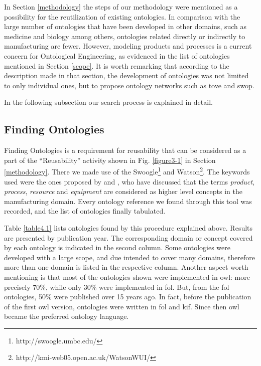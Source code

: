 In Section \ref{methodology} the steps of our methodology were mentioned as a possibility for the reutilization of existing ontologies. In comparison with the large number of ontologies that have been developed in other domains, such as medicine and biology among others, ontologies related directly or indirectly to manufacturing are fewer.  However, modeling products and processes is a current concern for Ontological Engineering, as evidenced in the list of ontologies mentioned in Section \ref{scope}. It is worth remarking that according to the description made in that section, the development of ontologies was not limited to only individual ones, but to propose ontology networks such as \gls{tove} and \gls{swop}. 

In the following subsection our search process is explained in detail. 


\subsection{Finding Ontologies}\label{4.2.1}

Finding Ontologies is a requirement for reusability that can be considered as a part of the “Reusability” activity shown in Fig. \ref{figure3-1} in Section \ref{methodology}. There we made use of the Swoogle\footnote{http://swoogle.umbc.edu/}  and Watson\footnote{http://kmi-web05.open.ac.uk/WatsonWUI/}. The keywords used were the ones proposed by \cite{martin_design_2003} and \cite{lastra_ontologies_2009}, who have discussed that the terms \textit{product}, \textit{process},  \textit{resource} and \textit{equipment} are considered as higher level concepts in the manufacturing domain. Every ontology reference we found through this tool was recorded, and the list of ontologies finally tabulated.

Table \ref{table4.1} lists ontologies found by this procedure explained above. Results are presented by publication year. The corresponding domain or concept covered by each ontology is indicated in the second column. Some ontologies were developed with a large scope, and due intended to cover many domains, therefore more than one domain is listed in the respective column. Another aspect worth mentioning is that most of the ontologies shown were implemented in \gls{owl}: more precisely 70\%, while only 30\% were implemented in \gls{fol}. But, from the \gls{fol} ontologies, 50\% were published over 15 years ago. In fact, before the publication of the first \gls{owl} version, ontologies were written in \gls{fol} and \gls{kif}. Since then \gls{owl} became the preferred ontology language. 

